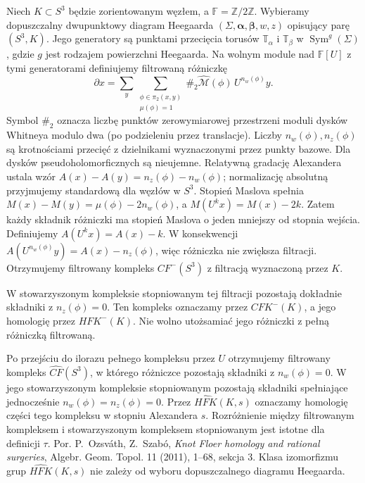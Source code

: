 \begin{definicja}
Niech $K\subset S^3$ będzie zorientowanym węzłem, a
$\mathbb F=\mathbb Z/2\mathbb Z$. Wybieramy dopuszczalny
dwupunktowy diagram Heegaarda $(\Sigma,\boldsymbol\alpha,
\boldsymbol\beta,w,z)$ opisujący parę $(S^3,K)$.
Jego generatory są punktami przecięcia torusów
$\mathbb T_{\alpha}$ i $\mathbb T_{\beta}$ w
$\operatorname{Sym}^{g}(\Sigma)$, gdzie $g$ jest
rodzajem powierzchni Heegaarda.
Na wolnym module nad $\mathbb F[U]$ z tymi
generatorami definiujemy filtrowaną różniczkę
\[
 \partial x=\sum_y
 \sum_{\substack{\phi\in\pi_2(x,y)\\\mu(\phi)=1}}
 \#_2\widehat{\mathcal M}(\phi)\,U^{n_w(\phi)}y.
\]
Symbol $\#_2$ oznacza liczbę punktów
zerowymiarowej przestrzeni moduli dysków
Whitneya modulo dwa (po podzieleniu przez
translacje). Liczby $n_w(\phi),n_z(\phi)$ są
krotnościami przecięć z dzielnikami
wyznaczonymi przez punkty bazowe. Dla dysków
pseudoholomorficznych są nieujemne.
Relatywną gradację Alexandera ustala wzór
$A(x)-A(y)=n_z(\phi)-n_w(\phi)$;
normalizację absolutną przyjmujemy standardową
dla węzłów w $S^3$. Stopień Maslova spełnia
$M(x)-M(y)=\mu(\phi)-2n_w(\phi)$,
a $M(U^kx)=M(x)-2k$. Zatem każdy składnik
różniczki ma stopień Maslova o jeden mniejszy
od stopnia wejścia. Definiujemy
$A(U^k x)=A(x)-k$. W konsekwencji
$A(U^{n_w(\phi)}y)=A(x)-n_z(\phi)$,
więc różniczka nie zwiększa filtracji.
Otrzymujemy filtrowany kompleks $CF^-(S^3)$
z filtracją wyznaczoną przez $K$.

W stowarzyszonym kompleksie stopniowanym tej
filtracji pozostają dokładnie składniki
z $n_z(\phi)=0$. Ten kompleks oznaczamy
przez $CFK^-(K)$, a jego homologię przez $HFK^-(K)$.
Nie wolno utożsamiać jego różniczki z pełną
różniczką filtrowaną.

Po przejściu do ilorazu pełnego kompleksu przez
$U$ otrzymujemy filtrowany kompleks
$\widehat{CF}(S^3)$, w którego różniczce pozostają
składniki z $n_w(\phi)=0$. W jego stowarzyszonym
kompleksie stopniowanym pozostają składniki
spełniające jednocześnie $n_w(\phi)=n_z(\phi)=0$.
Przez $\widehat{HFK}(K,s)$ oznaczamy homologię
części tego kompleksu w stopniu Alexandera $s$.
Rozróżnienie między filtrowanym kompleksem
i stowarzyszonym kompleksem stopniowanym jest
istotne dla definicji $\tau$.
Por. P.~Ozsváth, Z.~Szabó, \emph{Knot Floer homology
and rational surgeries}, Algebr. Geom. Topol. 11
(2011), 1--68, sekcja 3. Klasa izomorfizmu grup $\widehat{HFK}(K,s)$
nie zależy od wyboru dopuszczalnego diagramu Heegaarda.
\end{definicja}

